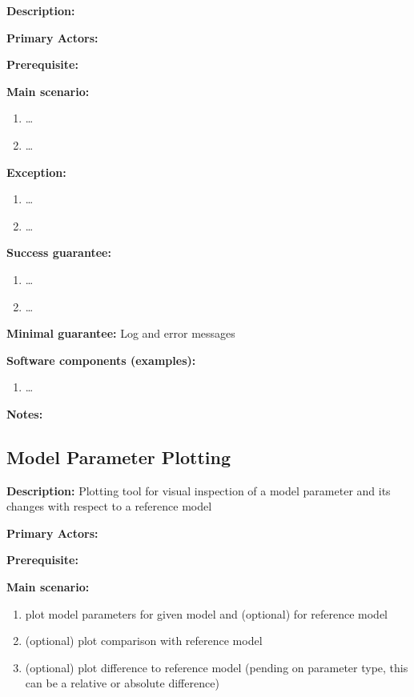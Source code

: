 \label{validation:Template}
\textbf{Description:}

\textbf{Primary Actors:}

\textbf{Prerequisite:}

\textbf{Main scenario:}

\begin{enumerate}
    \item \dots
    \item \dots
\end{enumerate}

\textbf{Exception:}
\begin{enumerate}
    \item \dots
    \item \dots
\end{enumerate}

\textbf{Success guarantee:}
\begin{enumerate}
    \item \dots
    \item \dots
\end{enumerate}

\textbf{Minimal guarantee:}
Log and error messages

\textbf{Software components (examples):}
\begin{enumerate}
    \item \dots
\end{enumerate}

\textbf{Notes:}



\subsection{Model Parameter Plotting}
\label{validation:ModelParameterPlotting}
\textbf{Description:}
Plotting tool for visual inspection of a model parameter and its changes with respect to a reference model

\textbf{Primary Actors:}

\textbf{Prerequisite:}

\textbf{Main scenario:}

\begin{enumerate}
    \item plot model parameters for given model and (optional) for reference model
    \item (optional) plot comparison with reference model
    \item (optional) plot difference to reference model (pending on parameter type, this can be a relative or absolute difference)
\end{enumerate}

